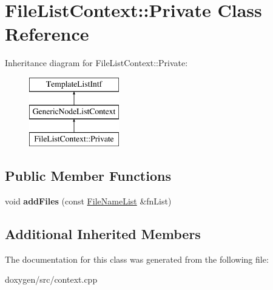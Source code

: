 \hypertarget{class_file_list_context_1_1_private}{}\section{File\+List\+Context\+::Private Class Reference}
\label{class_file_list_context_1_1_private}
Inheritance diagram for File\+List\+Context\+::Private\+:\begin{figure}[H]
\begin{center}
\leavevmode
\includegraphics[height=3.000000cm]{class_file_list_context_1_1_private}
\end{center}
\end{figure}
\subsection*{Public Member Functions}
\begin{DoxyCompactItemize}
\item 
\mbox{\label{class_file_list_context_1_1_private_accca039b0697855c5ecd3cecbb94dcb8}} 
void {\bfseries add\+Files} (const \mbox{\hyperlink{class_file_name_list}{File\+Name\+List}} \&fn\+List)
\end{DoxyCompactItemize}
\subsection*{Additional Inherited Members}


The documentation for this class was generated from the following file\+:\begin{DoxyCompactItemize}
\item 
doxygen/src/context.\+cpp\end{DoxyCompactItemize}

